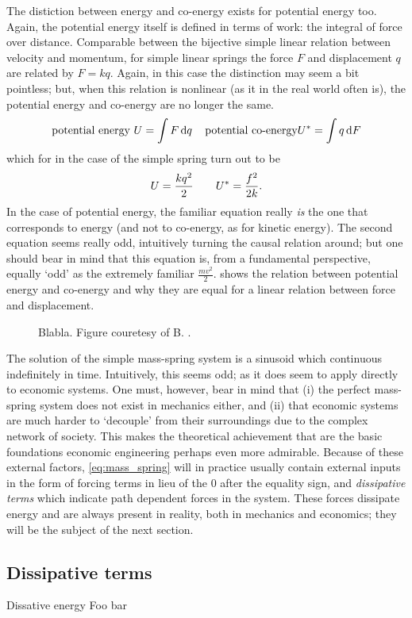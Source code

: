 The distiction between energy and co-energy exists for potential energy too. Again, the potential energy itself is defined in terms of work: the integral of force over distance. Comparable between the bijective simple linear relation between velocity and momentum, for simple linear springs the force $F$ and displacement $q$ are related by $F = kq$. Again, in this case the distinction may seem a bit pointless; but, when this relation is nonlinear (as it in the real world often is), the potential energy and co-energy are no longer the same. 
$$ \text{potential energy } U = \int F \dd{q} \quad \text{potential co-energy} U^* = \int q \dd{F} $$
which for in the case of the simple spring turn out to be
$$ U = \frac{kq^2}{2} \qquad U^* = \frac{f^2}{2k}. $$
In the case of potential energy, the familiar equation really \emph{is} the one that corresponds to energy (and not to co-energy, as for kinetic energy). The second equation seems really odd, intuitively turning the causal relation around; but one should bear in mind that this equation is, from a fundamental perspective, equally `odd' as the extremely familiar $\frac{mv^2}{2}$.  shows the relation between potential energy and co-energy and why they are equal for a linear relation between force and displacement.
\begin{figure}[ht]
    \centering
    
    \caption{Blabla. Figure couretesy of B. \citet{Krabbenborg2021}.}
    \label{fig:potential_energy}
\end{figure}
The solution of the simple mass-spring system is a sinusoid which continuous indefinitely in time. Intuitively, this seems odd; as it does seem to apply directly to economic systems. One must, however, bear in mind that (i) the perfect mass-spring system does not exist in mechanics either, and (ii) that economic systems are much harder to `decouple' from their surroundings due to the complex network of society. This makes the theoretical achievement that are the basic foundations economic engineering perhaps even more admirable. Because of these external factors, \cref{eq:mass_spring} will in practice usually contain external inputs in the form of forcing terms in lieu of the 0 after the equality sign, and \emph{dissipative terms} which indicate path dependent forces in the system. These forces dissipate energy and are always present in reality, both in mechanics and economics; they will be the subject of the next section. 

\subsection{Dissipative terms}
\begin{econ}{Dissative energy}
    Foo bar
\end{econ}

